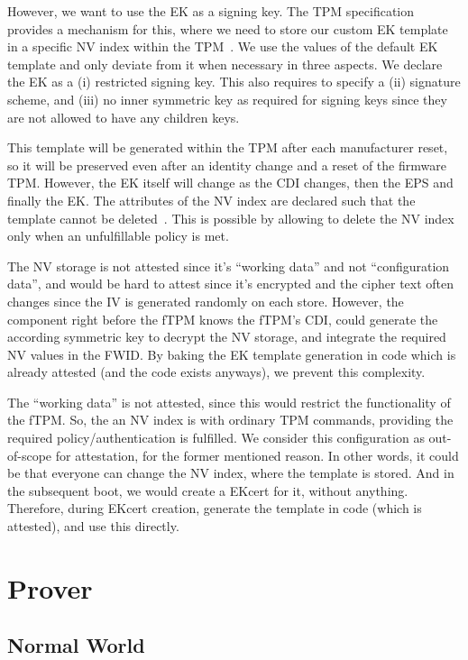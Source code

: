 However, we want to use the EK as a signing key.
The TPM specification provides a mechanism for this, where we need to store our custom EK template in a specific NV index within the TPM~\cite{tcg-ek}.
We use the values of the default EK template and only deviate from it when necessary in three aspects.
We declare the EK as a (i) restricted signing key.
This also requires to specify a (ii) signature scheme, and (iii) no inner symmetric key as required for signing keys since they are not allowed to have any children keys.

This template will be generated within the TPM after each manufacturer reset, so it will be preserved even after an identity change and a reset of the firmware TPM\@.
However, the EK itself will change as the CDI changes, then the EPS and finally the EK\@.
The attributes of the NV index are declared such that the template cannot be deleted~\cite{tcgPcClient}.
This is possible by allowing to delete the NV index only when an unfulfillable policy is met.

The NV storage is not attested since it's ``working data'' and not ``configuration data'', and would be hard to attest since it's encrypted and the cipher text often changes since the IV is generated randomly on each store.
However, the component right before the fTPM knows the fTPM's CDI, could generate the according symmetric key to decrypt the NV storage, and integrate the required NV values in the FWID\@.
By baking the EK template generation in code which is already attested (and the code exists anyways), we prevent this complexity.

The ``working data'' is not attested, since this would restrict the functionality of the fTPM\@.
So, the an NV index is with ordinary TPM commands, providing the required policy/authentication is fulfilled.
We consider this configuration as out-of-scope for attestation, for the former mentioned reason.
In other words, it could be that everyone can change the NV index, where the template is stored.
And in the subsequent boot, we would create a EKcert for it, without anything.
Therefore, during EKcert creation, generate the template in code (which is attested), and use this directly.

\section{Prover}
\subsection{Normal World}

